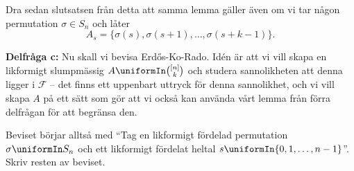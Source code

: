 \documentclass[nobib]{tufte-handout}
\begin{document}
\begin{xca}
    Dra sedan slutsatsen från detta att samma lemma gäller även om vi tar någon permutation $\sigma \in S_n$ och låter
    $$A_s = \{\sigma(s), \sigma(s+1), \ldots, \sigma(s + k - 1)\}.$$

    \textbf{Delfråga c:} Nu skall vi bevisa Erd\H{o}s-Ko-Rado. Idén är att vi vill skapa en likformigt slumpmässig $A \uniformIn \binom{[n]}{k}$ och studera sannolikheten att denna ligger i $\mathcal{F}$ -- det finns ett uppenbart uttryck för denna sannolikhet, och vi vill skapa $A$ på ett sätt som gör att vi också kan använda vårt lemma från förra delfrågan för att begränsa den.

    Beviset börjar alltså med ``Tag en likformigt fördelad permutation $\sigma \uniformIn S_n$ och ett likformigt fördelat heltal $s \uniformIn \{0,1,\ldots,n-1\}$''. Skriv resten av beviset.
\end{xca}
\end{document}

